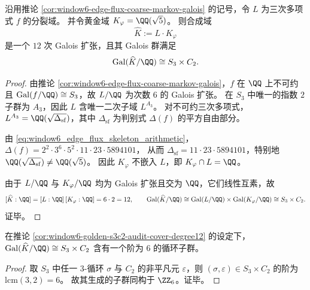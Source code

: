 \begin{corollary}\label{cor:window6-golden-s3c2-audit-cover-degree12}
沿用推论 \ref{cor:window6-edge-flux-coarse-markov-galois} 的记号，令 \(L\) 为三次多项式 \(f\) 的分裂域。
并令黄金域 \(K_\varphi=\QQ(\sqrt5)\)。
则合成域
\[
\widehat K:=L\cdot K_\varphi
\]
是一个 \(12\) 次 Galois 扩张，且其 Galois 群满足
\[
\mathrm{Gal}(\widehat K/\QQ)\cong S_3\times C_2.
\]
\end{corollary}
\begin{proof}
由推论 \ref{cor:window6-edge-flux-coarse-markov-galois}，\(f\) 在 \(\QQ\) 上不可约且 \(\mathrm{Gal}(f/\QQ)\cong S_3\)，故 \(L/\QQ\) 为次数 \(6\) 的 Galois 扩张。
在 \(S_3\) 中唯一的指数 \(2\) 子群为 \(A_3\)，因此 \(L\) 含唯一二次子域 \(L^{A_3}\)。
对不可约三次多项式，\(L^{A_3}=\QQ(\sqrt{\Delta_{\mathrm{sf}}})\)，其中 \(\Delta_{\mathrm{sf}}\) 为判别式 \(\Delta(f)\) 的平方自由部分。
\par
由 \eqref{eq:window6_edge_flux_skeleton_arithmetic}，
\(
\Delta(f)=2^2\cdot 3^6\cdot 5^2\cdot 11\cdot 23\cdot 5894101
\)，
从而 \(\Delta_{\mathrm{sf}}=11\cdot 23\cdot 5894101\)，特别地 \(\QQ(\sqrt{\Delta_{\mathrm{sf}}})\neq \QQ(\sqrt5)\)。
因此 \(K_\varphi\) 不嵌入 \(L\)，即 \(K_\varphi\cap L=\QQ\)。
\par
由于 \(L/\QQ\) 与 \(K_\varphi/\QQ\) 均为 Galois 扩张且交为 \(\QQ\)，它们线性互素，故
\[
[\widehat K:\QQ]=[L:\QQ]\,[K_\varphi:\QQ]=6\cdot 2=12,
\qquad
\mathrm{Gal}(\widehat K/\QQ)\cong \mathrm{Gal}(L/\QQ)\times \mathrm{Gal}(K_\varphi/\QQ)\cong S_3\times C_2.
\]
证毕。
\end{proof}

\begin{corollary}\label{cor:window6-golden-s3c2-c6-phase-source}
在推论 \ref{cor:window6-golden-s3c2-audit-cover-degree12} 的设定下，
\(\mathrm{Gal}(\widehat K/\QQ)\cong S_3\times C_2\) 含有一个阶为 \(6\) 的循环子群。
\end{corollary}
\begin{proof}
取 \(S_3\) 中任一 \(3\)-循环 \(\sigma\) 与 \(C_2\) 的非平凡元 \(\varepsilon\)，则 \((\sigma,\varepsilon)\in S_3\times C_2\) 的阶为 \(\mathrm{lcm}(3,2)=6\)。
故其生成的子群同构于 \(\ZZ_6\)。证毕。
\end{proof}

